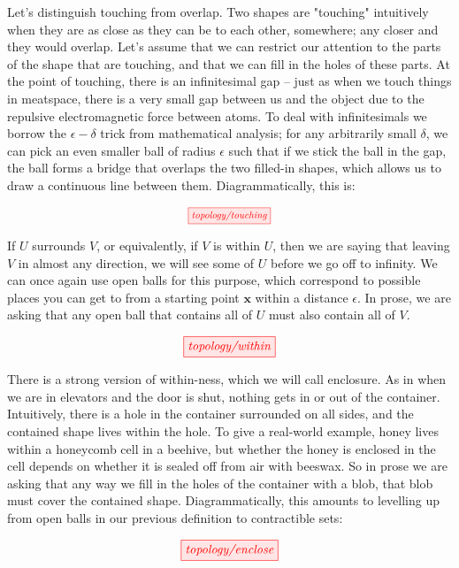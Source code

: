 Let's distinguish touching from overlap. Two shapes are "touching" intuitively when they are as close as they can be to each other, somewhere; any closer and they would overlap. Let's assume that we can restrict our attention to the parts of the shape that are touching, and that we can fill in the holes of these parts. At the point of touching, there is an infinitesimal gap -- just as when we touch things in meatspace, there is a very small gap between us and the object due to the repulsive electromagnetic force between atoms. To deal with infinitesimals we borrow the $\epsilon-\delta$ trick from mathematical analysis; for any arbitrarily small $\delta$, we can pick an even smaller ball of radius $\epsilon$ such that if we stick the ball in the gap, the ball forms a bridge that overlaps the two filled-in shapes, which allows us to draw a continuous line between them. Diagrammatically, this is: 

\[\scalebox{0.8}{\tikzfig{topology/touching}}\]


If $U$ surrounds $V$, or equivalently, if $V$ is within $U$, then we are saying that leaving $V$ in almost any direction, we will see some of $U$ before we go off to infinity. We can once again use open balls for this purpose, which correspond to possible places you can get to from a starting point $\mathbf{x}$ within a distance $\epsilon$. In prose, we are asking that any open ball that contains all of $U$ must also contain all of $V$.

\[\tikzfig{topology/within}\]


There is a strong version of within-ness, which we will call enclosure. As in when we are in elevators and the door is shut, nothing gets in or out of the container. Intuitively, there is a hole in the container surrounded on all sides, and the contained shape lives within the hole. To give a real-world example, honey lives within a honeycomb cell in a beehive, but whether the honey is enclosed in the cell depends on whether it is sealed off from air with beeswax. So in prose we are asking that any way we fill in the holes of the container with a blob, that blob must cover the contained shape. Diagrammatically, this amounts to levelling up from open balls in our previous definition to contractible sets:

\[\tikzfig{topology/enclose}\]


